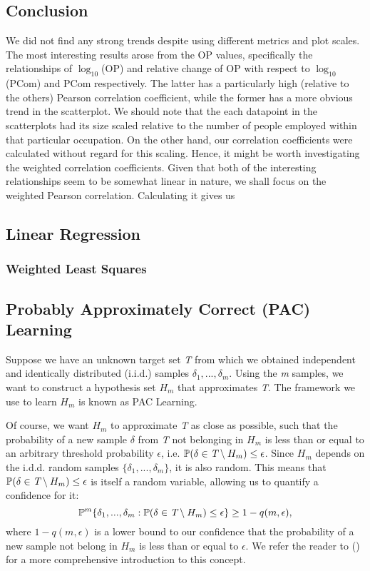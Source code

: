 \documentclass[11pt]{article}
\begin{document}
\subsection{Conclusion}
We did not find any strong trends despite using different metrics and plot scales. The most interesting results arose from the OP values, specifically the relationships of $\log_{10}$(OP) and relative change of OP with respect to $\log_{10}$(PCom) and PCom respectively. The latter has a particularly high (relative to the others) Pearson correlation coefficient, while the former has a more obvious trend in the scatterplot. We should note that the each datapoint in the scatterplots had its size scaled relative to the number of people employed within that particular occupation. On the other hand, our correlation coefficients were calculated without regard for this scaling. Hence, it might be worth investigating the weighted correlation coefficients. Given that both of the interesting relationships seem to be somewhat linear in nature, we shall focus on the weighted Pearson correlation. Calculating it gives us 

\subsection{Linear Regression}

\subsubsection*{Weighted Least Squares}

\subsection{Probably Approximately Correct (PAC) Learning}
Suppose we have an unknown target set \emph{T} from which we obtained independent and identically distributed (i.i.d.) samples $\delta_{1},...,\delta_{m}$. Using the \emph{m} samples, we want to construct a hypothesis set $H_{m}$ that approximates \emph{T}. The framework we use to learn $H_{m}$ is known as PAC Learning.

Of course, we want $H_{m}$ to approximate \emph{T} as close as possible, such that the probability of a new sample $\delta$ from \emph{T} not belonging in $H_{m}$ is less than or equal to an arbitrary threshold probability $\epsilon$, i.e. $\mathbb{P}(\delta \in \emph{T} \setminus H_{m}) \leq \epsilon$. Since $H_{m}$ depends on the i.d.d. random samples $\{\delta_{1},...,\delta_{m}\}$, it is also random. This means that $\mathbb{P}(\delta \in \emph{T} \setminus H_{m}) \leq \epsilon$ is itself a random variable, allowing us to quantify a confidence for it:
\begin{equation}
	\label{eq:1}
	\mathbb{P}^{m} \{\delta_{1},...,\delta_{m}: \mathbb{P}(\delta \in \emph{T} \setminus H_{m}) \leq \epsilon \} \geq 1 - q(m,\epsilon),
\end{equation}
where $1 - q(m,\epsilon)$ is a lower bound to our confidence that the probability of a new sample not belong in $H_{m}$ is less than or equal to $\epsilon$. We refer the reader to (\cite{paclearning1}) for a more comprehensive introduction to this concept.
\end{document}
